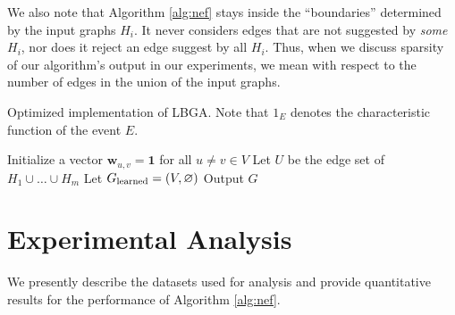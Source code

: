 \documentclass{article}
\begin{document}
We also note that Algorithm \ref{alg:nef} stays inside the ``boundaries'' 
determined by the input graphs $H_i$.  It never considers edges that are not
suggested by \emph{some} $H_i$, nor does it reject an edge suggest by all 
$H_i$. Thus, when we discuss sparsity of our algorithm's output in our
experiments, we mean with respect to the number of edges in the union of the
input graphs.

\begin{algorithm}[tbh]
\caption{Optimized implementation of LBGA. Note that $1_E$ denotes the
characteristic function of the event $E$.}
\label{alg:nef}
   \DontPrintSemicolon
   \SetAlgoLined
   {\footnotesize
   Initialize a vector $\mathbf{w}_{u,v} = \mathbf{1}$ for all $u \neq v \in V$\;
   Let $U$ be the edge set of $H_1 \cup \dots \cup H_m$\;
   Let $G_\textup{learned} = (V, \varnothing)$ \;
   Output $G$\;
}
\end{algorithm}

\section{Experimental Analysis}
\label{sec:experiments}
We presently describe the datasets used for analysis and provide quantitative
results for the performance of Algorithm \ref{alg:nef}. 
\end{document}
